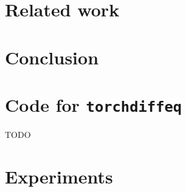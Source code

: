 \documentclass{article}
\theoremstyle{plain}
\theoremstyle{definition}
\begin{document}
\section{Related work}

\section{Conclusion}



\newpage
\appendix

\section{Code for \texttt{torchdiffeq}}\label{appendix:torchdiffeq}
TODO

\section{Experiments}\label{appendix:experiments}
\end{document}

